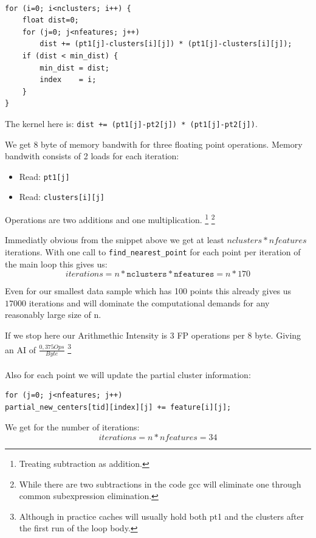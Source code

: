 \paragraph{}
\begin{lstlisting}[caption={Inlined representation of find\_nearest\_point}]
for (i=0; i<nclusters; i++) {
	float dist=0;
	for (j=0; j<nfeatures; j++)
		dist += (pt1[j]-clusters[i][j]) * (pt1[j]-clusters[i][j]);
	if (dist < min_dist) {
		min_dist = dist;
		index    = i;
	}
}
\end{lstlisting}
The kernel here is:
\texttt{dist += (pt1[j]-pt2[j]) * (pt1[j]-pt2[j])}.\newline

We get 8 byte of memory bandwith for three floating point operations.
Memory bandwith consists of 2 loads for each iteration:
\begin{itemize}
	\item Read: \texttt{pt1[j]}
	\item Read: \texttt{clusters[i][j]}
\end{itemize}
Operations are two additions and one multiplication.
\footnote{Treating subtraction as addition.}
\footnote{While there are two subtractions in the code gcc will eliminate one through common subexpression elimination.}


Immediatly obvious from the snippet above we get at least $nclusters * nfeatures$ iterations.
With one call to \texttt{find\_nearest\_point} for each point per iteration of the main loop this gives us:\\
$$iterations = n * \texttt{nclusters} * \texttt{nfeatures} = n * 170$$

Even for our smallest data sample which has 100 points this already gives us $17000$ iterations and will dominate the computational demands for any reasonably large size of n.

If we stop here our Arithmethic Intensity is 3 FP operations per 8 byte. Giving an AI of $\frac{0,375 Ops}{Byte}$
\footnote{Although in practice caches will usually hold both pt1 and the clusters after the first run of the loop body.}


\paragraph{}
Also for each point we will update the partial cluster information:
\begin{lstlisting}[caption={Updating (partial) cluster information},label=lblUpdPartClst]
for (j=0; j<nfeatures; j++)
partial_new_centers[tid][index][j] += feature[i][j];
\end{lstlisting}
We get for the number of iterations:
$$iterations = n * nfeatures = 34$$

